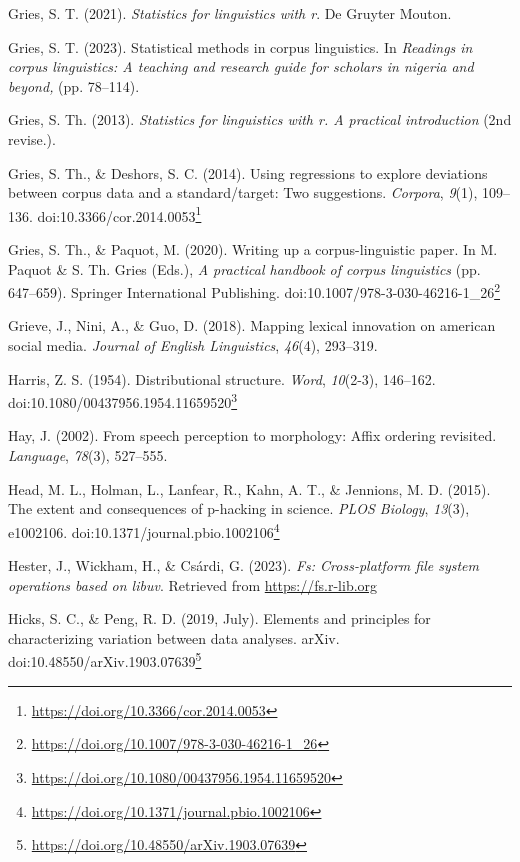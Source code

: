 \documentclass[
  letterpaper,
]{book}
\newlength{\cslhangindent}
\newenvironment{CSLReferences}[2] %
 {\begin{list}{}{%
  \setlength{\itemindent}{0pt}
  \setlength{\leftmargin}{0pt}
  \setlength{\parsep}{0pt}
  \ifodd #1
   \setlength{\leftmargin}{\cslhangindent}
   \setlength{\itemindent}{-1\cslhangindent}
  \fi
  \setlength{\itemsep}{#2\baselineskip}}}
 {\end{list}}
\theoremstyle{definition}
\theoremstyle{remark}
\DeclareRobustCommand{\href}[2]{#2\footnote{\url{#1}}}
\begin{document}
\begin{CSLReferences}{1}{0}
Gries, S. T. (2021). \emph{Statistics for linguistics with r}. De
Gruyter Mouton.

Gries, S. T. (2023). Statistical methods in corpus linguistics. In
\emph{Readings in corpus linguistics: A teaching and research guide for
scholars in nigeria and beyond,} (pp. 78--114).

Gries, S. Th. (2013). \emph{Statistics for linguistics with r. A
practical introduction} (2nd revise.).

Gries, S. Th., \& Deshors, S. C. (2014). Using regressions to explore
deviations between corpus data and a standard/target: Two suggestions.
\emph{Corpora}, \emph{9}(1), 109--136.
doi:\href{https://doi.org/10.3366/cor.2014.0053}{10.3366/cor.2014.0053}

Gries, S. Th., \& Paquot, M. (2020). Writing up a corpus-linguistic
paper. In M. Paquot \& S. Th. Gries (Eds.), \emph{A practical handbook
of corpus linguistics} (pp. 647--659). Springer International
Publishing.
doi:\href{https://doi.org/10.1007/978-3-030-46216-1_26}{10.1007/978-3-030-46216-1\_26}

Grieve, J., Nini, A., \& Guo, D. (2018). Mapping lexical innovation on
american social media. \emph{Journal of English Linguistics},
\emph{46}(4), 293--319.

Harris, Z. S. (1954). Distributional structure. \emph{Word},
\emph{10}(2-3), 146--162.
doi:\href{https://doi.org/10.1080/00437956.1954.11659520}{10.1080/00437956.1954.11659520}

Hay, J. (2002). From speech perception to morphology: Affix ordering
revisited. \emph{Language}, \emph{78}(3), 527--555.

Head, M. L., Holman, L., Lanfear, R., Kahn, A. T., \& Jennions, M. D.
(2015). The extent and consequences of p-hacking in science. \emph{PLOS
Biology}, \emph{13}(3), e1002106.
doi:\href{https://doi.org/10.1371/journal.pbio.1002106}{10.1371/journal.pbio.1002106}

Hester, J., Wickham, H., \& Csárdi, G. (2023). \emph{Fs: Cross-platform
file system operations based on libuv}. Retrieved from
\url{https://fs.r-lib.org}

Hicks, S. C., \& Peng, R. D. (2019, July). Elements and principles for
characterizing variation between data analyses. arXiv.
doi:\href{https://doi.org/10.48550/arXiv.1903.07639}{10.48550/arXiv.1903.07639}


\end{CSLReferences}
\end{document}
